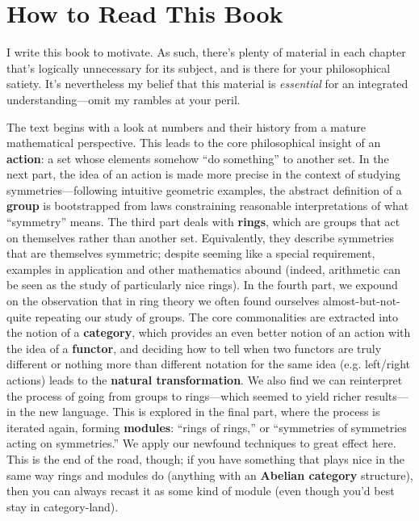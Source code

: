 \chapter*{How to Read This Book}
I write this book to motivate.
As such, there's plenty of material in each chapter that's logically unnecessary for its subject, and is there for your philosophical satiety.
It's nevertheless my belief that this material is \textit{essential} for an integrated understanding---omit my rambles at your peril.

The text begins with a look at numbers and their history from a mature mathematical perspective.
This leads to the core philosophical insight of an \textbf{action}: a set whose elements somehow ``do something'' to another set.
In the next part, the idea of an action is made more precise in the context of studying symmetries---following intuitive geometric examples,
the abstract definition of a \textbf{group} is bootstrapped from laws constraining reasonable interpretations of what ``symmetry'' means.
The third part deals with \textbf{rings}, which are groups that act on themselves rather than another set.
Equivalently, they describe symmetries that are themselves symmetric; despite seeming like a special requirement,
examples in application and other mathematics abound (indeed, arithmetic can be seen as the study of particularly nice rings).
In the fourth part, we expound on the observation that in ring theory we often found ourselves almost-but-not-quite repeating our study of groups.
The core commonalities are extracted into the notion of a \textbf{category},
which provides an even better notion of an action with the idea of a \textbf{functor},
and deciding how to tell when two functors are truly different or nothing more than different notation for the same idea (e.g. left/right actions)
leads to the \textbf{natural transformation}.
We also find we can reinterpret the process of going from groups to rings---which seemed to yield richer results---in the new language.
This is explored in the final part, where the process is iterated again, forming \textbf{modules}: ``rings of rings,''
or ``symmetries of symmetries acting on symmetries.''
We apply our newfound techniques to great effect here.
This is the end of the road, though; if you have something that plays nice in the same way rings and modules do
(anything with an \textbf{Abelian category} structure), then you can always recast it as some kind of module
(even though you'd best stay in category-land).

